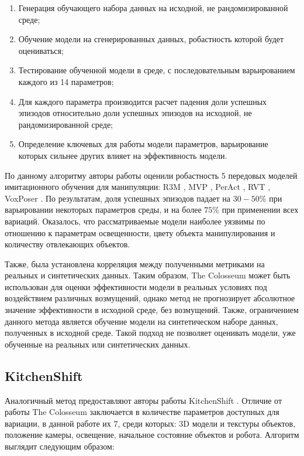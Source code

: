         \begin{enumerate}
            \item Генерация обучающего набора данных на исходной, не рандомизированной среде;
            \item Обучение модели на сгенерированных данных, робастность которой будет оцениваться;
            \item Тестирование обученной модели в среде, с последовательным варьированием каждого из 14 параметров;
            \item Для каждого параметра производится расчет падения доли успешных эпизодов относительно доли успешных эпизодов на исходной, не рандомизированной среде;
            \item Определение ключевых для работы модели параметров, варьирование которых сильнее других влияет на эффективность модели.
        \end{enumerate}
    
        По данному алгоритму авторы работы оценили робастность 5 передовых моделей имитационного обучения для манипуляции: R3M \cite{nair2022r3m}, MVP \cite{Radosavovic2022}, PerAct \cite{shridhar2022peract}, RVT \cite{goyal2023rvt}, VoxPoser \cite{huang2023voxposer}. По результатам, доля успешных эпизодов падает на $30-50\%$ при варьировании некоторых параметров среды, и на более $75\%$ при применении всех вариаций. Оказалось, что рассматриваемые модели наиболее уязвимы по отношению к параметрам освещенности, цвету объекта манипулирования и количеству отвлекающих объектов. 

        Также, была установлена корреляция между полученными метриками на реальных и синтетических данных. Таким образом, The Colosseum может быть использован для оценки эффективности модели в реальных условиях под воздействием различных возмущений, однако метод не прогнозирует абсолютное значение эффективности в исходной среде, без возмущений. Также, ограничением данного метода является обучение модели на синтетическом наборе данных, полученных в исходной среде. Такой подход не позволяет оценивать модели, уже обученные на реальных или синтетических данных. 
    
        \subsection{KitchenShift}
            Аналогичный метод предоставляют авторы работы KitchenShift \cite{xing2021kitchenshift}. Отличие от работы The Colosseum заключается в количестве параметров доступных для вариации, в данной работе их 7, среди которых: 3D модели и текстуры объектов, положение камеры, освещение, начальное состояние объектов и робота. Алгоритм выглядит следующим образом:
    
